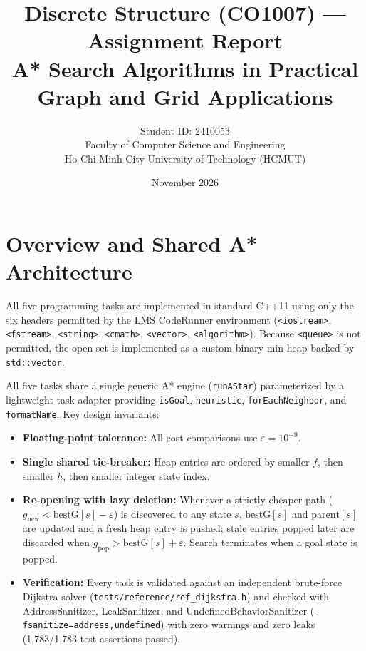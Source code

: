 \documentclass[11pt,a4paper]{article}
\title{\textbf{Discrete Structure (CO1007) --- Assignment Report}\\
\large A* Search Algorithms in Practical Graph and Grid Applications}
\author{Student ID: 2410053\\
Faculty of Computer Science and Engineering\\
Ho Chi Minh City University of Technology (HCMUT)}
\date{November 2026}
\begin{document}
\maketitle
\tableofcontents
\newpage

\section{Overview and Shared A* Architecture}

All five programming tasks are implemented in standard C++11 using only the six headers permitted by the LMS CodeRunner environment (\texttt{<iostream>}, \texttt{<fstream>}, \texttt{<string>}, \texttt{<cmath>}, \texttt{<vector>}, \texttt{<algorithm>}). Because \texttt{<queue>} is not permitted, the open set is implemented as a custom binary min-heap backed by \texttt{std::vector}.

All five tasks share a single generic A* engine (\texttt{runAStar}) parameterized by a lightweight task adapter providing \texttt{isGoal}, \texttt{heuristic}, \texttt{forEachNeighbor}, and \texttt{formatName}. Key design invariants:
\begin{itemize}
    \item \textbf{Floating-point tolerance:} All cost comparisons use $\varepsilon = 10^{-9}$.
    \item \textbf{Single shared tie-breaker:} Heap entries are ordered by smaller $f$, then smaller $h$, then smaller integer state index.
    \item \textbf{Re-opening with lazy deletion:} Whenever a strictly cheaper path ($g_{\text{new}} < \text{bestG}[s] - \varepsilon$) is discovered to any state $s$, $\text{bestG}[s]$ and $\text{parent}[s]$ are updated and a fresh heap entry is pushed; stale entries popped later are discarded when $g_{\text{pop}} > \text{bestG}[s] + \varepsilon$. Search terminates when a goal state is popped.
    \item \textbf{Verification:} Every task is validated against an independent brute-force Dijkstra solver (\texttt{tests/reference/ref\_dijkstra.h}) and checked with AddressSanitizer, LeakSanitizer, and UndefinedBehaviorSanitizer (\texttt{-fsanitize=address,undefined}) with zero warnings and zero leaks (1,783/1,783 test assertions passed).
\end{itemize}

\end{document}
